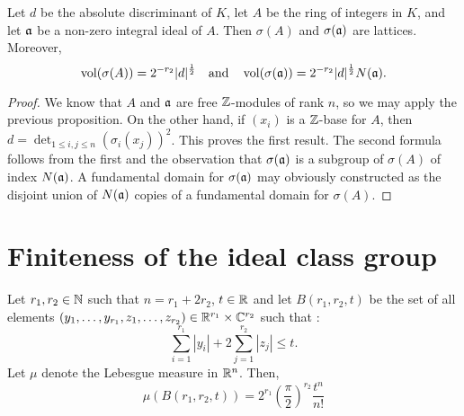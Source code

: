 \begin{prop}
  Let $d$ be the absolute discriminant of $K$, let $A$ be the ring of integers in $K$, and let $\mathfrak{a}$ be a non-zero integral ideal of $A$. Then $\sigma(A)$ and $\sigma(\mathfrak{a})$ are lattices. Moreover,
  \[\operatorname{vol}(\sigma(A)) = 2^{-r_2}|d|^{\frac12}\quad\text{and}\quad \operatorname{vol}(\sigma(\mathfrak{a})) = 2^{-r_2}|d|^{\frac12}N(\mathfrak{a}).\]
\end{prop}

\begin{proof}
  We know that $A$ and $\mathfrak{a}$ are free $\mathbb{Z}$-modules of rank $n$, so we may apply the previous proposition. On the other hand, if $(x_i)$ is a $\mathbb{Z}$-base for $A$, then $d = \det_{1\leq i,j\leq n}(\sigma_{i}(x_j))^2$. This proves the first result. The second formula follows from the first and the observation that $\sigma(\mathfrak{a})$ is a subgroup of $\sigma(A)$ of index $N(\mathfrak{a})$. A fundamental domain for $\sigma(\mathfrak{a})$ may obviously constructed as the disjoint union of $N(\mathfrak{a})$ copies of a fundamental domain for $\sigma(A)$.
\end{proof}

\section{Finiteness of the ideal class group}
\begin{prop}
  Let $r_1,r_2\in \mathbb{N}$ such that $n=r_1+2r_2$, $t\in \mathbb{R}$ and let $B(r_1,r_2,t)$ be the set of all elements $(y_1,\ldots, y_{r_1}, z_1,\ldots, z_{r_2})\in \mathbb{R}^{r_1}\times \mathbb{C}^{r_2}$ such that :
    \[\sum_{i=1}^{r_1}|y_i| + 2\sum_{j=1}^{r_2}|z_j| \leq t.\]
  Let $\mu$ denote the Lebesgue measure in $\mathbb{R}^n$. Then,
  \[\mu(B(r_1,r_2,t)) = 2^{r_1}\left(\frac{\pi}{2}\right)^{r_2}\frac{t^n}{n!}\tag{for any $t\geq 0$.}\]
\end{prop}

